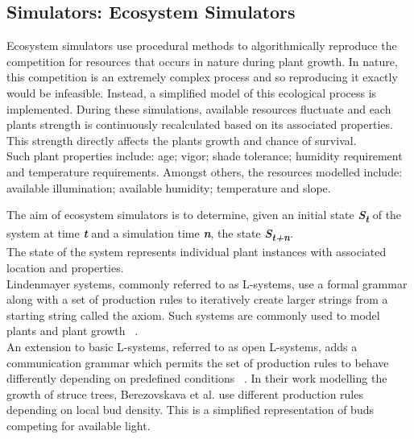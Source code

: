 \subsection{Simulators: Ecosystem Simulators} 

Ecosystem simulators use procedural methods to algorithmically reproduce the competition for resources that occurs in nature during plant growth. In nature, this competition is an extremely complex process and so reproducing it exactly would be infeasible. Instead, a simplified model of this ecological process is implemented. During these simulations, available resources fluctuate and each plants strength is continuously recalculated based on its associated properties. This strength directly affects the plants growth and chance of survival. \\
Such plant properties include: age; vigor; shade tolerance; humidity requirement and temperature requirements. Amongst others, the resources modelled include: available illumination; available humidity; temperature and slope.

The aim of ecosystem simulators is to determine, given an initial state \textbf{\textit{S\textsubscript{t}}} of the system at time \textbf{\textit{t}} and a simulation time \textbf{\textit{n}}, the state \textbf{\textit{S\textsubscript{t+n}}}. \\
The state of the system represents individual plant instances with associated location and properties. \\

Lindenmayer systems, commonly referred to as L-systems, use a formal grammar along with a set of production rules to iteratively create larger strings from a starting string called the axiom. Such systems are commonly used to model plants and plant growth ~\cite{Prusinkiewicz1990,Deussen2002,Boudon2012,Prusinkiewicz1993}. \\
An extension to basic L-systems, referred to as open L-systems, adds a communication grammar which permits the set of production rules to behave differently depending on predefined conditions ~\cite{Prusinkiewicz1996}. In their work modelling the growth of struce trees, Berezovskava et al. \cite{Berezovskava1997} use different production rules depending on local bud density. This is a simplified representation of buds competing for available light. \\


